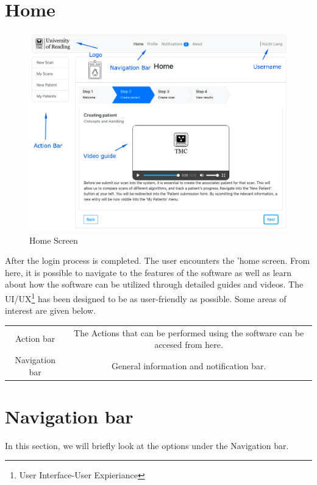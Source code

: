 	\section{Home}
		\begin{figure}[H]
			\iftrue
			\centering
			\caption{Home Screen}
			\includegraphics[scale=0.3]{figures/home}
			\fi
		\end{figure}
		After the login process is completed. The user encounters the 'home screen. From here, it is possible to navigate to the features of the software
		as well as learn about how the software can be utilized through detailed guides and videos. The UI/UX\footnote{User Interface-User Expieriance} 
		has been designed to be as user-friendly as possible. Some areas of interest are given below.
		\begin{center}
			\begin{tabular}{ |c|c| } 
				\hline
				Action bar & The Actions that can be performed using the software can be accesed from here.\\
				Navigation bar & General information and notification bar. \\
				\hline
			\end{tabular}
		\end{center}
	\section{Navigation bar}
		In this section, we will briefly look at the options under the Navigation bar.
